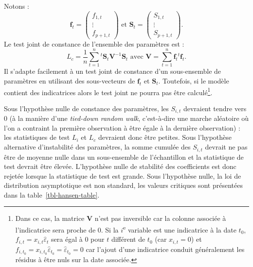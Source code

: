 \documentclass[
  a4paper,
  DIV=11,
  numbers=noendperiod,
  french]{scrartcl}
\newcommand\1{{\mathds 1}}
\newcommand{\transp}[1]{{}^t\!#1}
\newcommand{\bf}[1]{{\boldsymbol #1}}
\theoremstyle{remark}
\begin{document}
Notons : \[
\bf f_t= \begin{pmatrix}
f_{1,t} \\ \vdots \\ f_{p+1,t}
\end{pmatrix} \text{ et }
\bf S_t= \begin{pmatrix}
S_{1,t} \\ \vdots \\ S_{p+1,t}
\end{pmatrix}.
\] Le test joint de constance de l'ensemble des paramètres est : \[
L_c = \frac{1}{n}
\sum_{t=1}^n\transp{\bf S_t}\bf V^{-1}\bf S_t
\text{ avec }\bf V=\sum_{t=1}^n\bf f_{t}\transp{\bf f_{t}}.
\] Il s'adapte facilement à un test joint de constance d'un
sous-ensemble de paramètres en utilisant des sous-vecteurs de
\(\bf f_t\) et \(\bf S_t.\) Toutefois, si le modèle contient des
indicatrices alors le test joint ne pourra pas être calculé\footnote{
  Dans ce cas, la matrice \(\bf V\) n'est pas inversible car la colonne
  associée à l'indicatrice sera proche de 0. Si la
  \(i\)\textsuperscript{e} variable est une indicatrice à la date
  \(t_0\), \(f_{i,t}=x_{i,t}\hat\varepsilon_t\) sera égal à 0 pour \(t\)
  différent de \(t_0\) (car \(x_{i,t}=0\)) et
  \(f_{i,t_{0}}=x_{i,t_{0}}\hat\varepsilon_{t_0}=\hat\varepsilon_{t_0}= 0\)
  car l'ajout d'une indicatrice conduit généralement les résidus à être
  nuls sur la date associée.}.

Sous l'hypothèse nulle de constance des paramètres, les \(S_{i,t}\)
devraient tendre vers 0 (à la manière d'une \emph{tied-down random
walk}, c'est-à-dire une marche aléatoire où l'on a contraint la première
observation à être égale à la dernière observation) : les statistiques
de test \(L_i\) et \(L_c\) devraient donc être petites. Sous l'hypothèse
alternative d'instabilité des paramètres, la somme cumulée des
\(S_{i,t}\) devrait ne pas être de moyenne nulle dans un sous-ensemble
de l'échantillon et la statistique de test devrait être élevée.
L'hypothèse nulle de stabilité des coefficients est donc rejetée lorsque
la statistique de test est grande. Sous l'hypothèse nulle, la loi de
distribution asymptotique est non standard, les valeurs critiques sont
présentées dans la table~\ref{tbl-hansen-table}.
\end{document}

